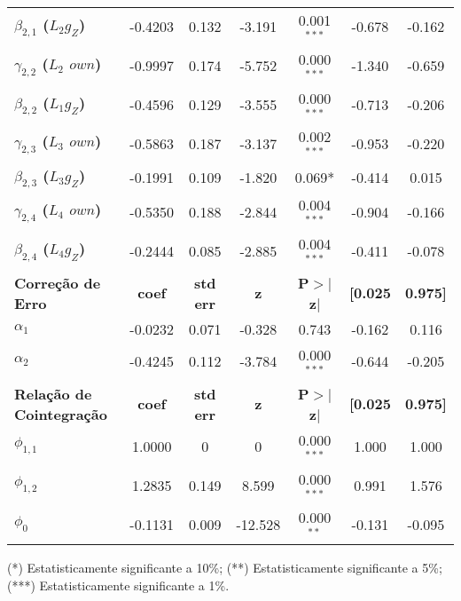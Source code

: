 \begin{threeparttable}
\begin{tabular}{lcccccc}
		\textbf{$\beta_{2,1}$ ($L_2 g_Z$)}           &      -0.4203  &        0.132     &    -3.191  &         0.001$^{***}$        &       -0.678    &       -0.162     \\
		\textbf{$\gamma_{2,2}$ ($L_2$ $own$)} &      -0.9997  &        0.174     &    -5.752  &         0.000$^{***}$        &       -1.340    &       -0.659     \\
		\textbf{$\beta_{2,2}$ ($L_1 g_Z$)}           &      -0.4596  &        0.129     &    -3.555  &         0.000$^{***}$        &       -0.713    &       -0.206     \\
		\textbf{$\gamma_{2,3}$ ($L_3$ $own$)} &      -0.5863  &        0.187     &    -3.137  &         0.002$^{***}$        &       -0.953    &       -0.220     \\
		\textbf{$\beta_{2,3}$ ($L_3 g_Z$)}           &      -0.1991  &        0.109     &    -1.820  &         0.069*        &       -0.414    &        0.015     \\
		\textbf{$\gamma_{2,4}$ ($L_4$ $own$)} &      -0.5350  &        0.188     &    -2.844  &         0.004$^{***}$        &       -0.904    &       -0.166     \\
		\textbf{$\beta_{2,4}$ ($L_4 g_Z$)}           &      -0.2444  &        0.085     &    -2.885  &         0.004$^{***}$        &       -0.411    &       -0.078     \\
		\midrule
		\textbf{Correção de Erro} & \textbf{coef} & \textbf{std err} & \textbf{z} & \textbf{P$> |$z$|$} & \textbf{[0.025} & \textbf{0.975]}  \\
		\midrule
		\textbf{$\alpha_1$} &      -0.0232  &        0.071     &    -0.328  &         0.743        &       -0.162    &        0.116     \\
		\textbf{$\alpha_2$} &      -0.4245  &        0.112     &    -3.784  &         0.000$^{***}$        &       -0.644    &       -0.205     \\
		\midrule
		\textbf{Relação de Cointegração} & \textbf{coef} & \textbf{std err} & \textbf{z} & \textbf{P$> |$z$|$} & \textbf{[0.025} & \textbf{0.975]}  \\
		\midrule
		\textbf{$\phi_{1,1}$} &       1.0000  &            0     &         0  &         0.000$^{***}$        &        1.000    &        1.000     \\
		\textbf{$\phi_{1,2}$} &       1.2835  &        0.149     &     8.599  &         0.000$^{***}$        &        0.991    &        1.576     \\
		\textbf{$\phi_0$}  &      -0.1131  &        0.009     &   -12.528  &         0.000$^{**}$       &       -0.131    &       -0.095     \\
		\hline
		\hline
	\end{tabular}
\footnotesize{(*) Estatisticamente significante a 10\%; (**) Estatisticamente significante a 5\%; (***) Estatisticamente significante a 1\%.}
\end{threeparttable}